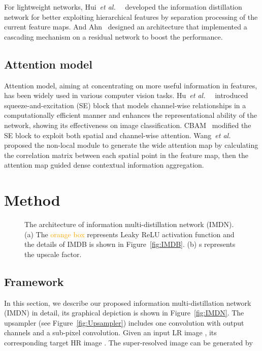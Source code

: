 \documentclass[sigconf]{acmart}
\newcommand{\etal}{\emph{et al.}~}
\begin{document}
For lightweight networks, Hui~\etal~\cite{IDN} developed the information distillation network for better exploiting hierarchical features by separation processing of the current feature maps. And Ahn~\cite{CARN} designed an architecture that implemented a cascading mechanism on a residual network to boost the performance.
\subsection{Attention model}
Attention model, aiming at concentrating on more useful information in features, has been widely used in various computer vision tasks. Hu~\etal~\cite{SENet} introduced squeeze-and-excitation (SE) block that models channel-wise relationships in a computationally efficient manner and enhances the representational ability of the network, showing its effectiveness on image classification. CBAM~\cite{CBAM} modified the SE block to exploit both spatial and channel-wise attention. Wang~\etal~\cite{non-local} proposed the non-local module to generate the wide attention map by calculating the correlation matrix between each spatial point in the feature map, then the attention map guided dense contextual information aggregation.

\section{Method}
\begin{figure*}[htpb]
	\centering
	\hfil
	\vspace{-3mm}
	\caption{The architecture of information multi-distillation network (IMDN). (a) The \textcolor{orange}{orange box} represents Leaky ReLU activation function and the details of IMDB is shown in Figure~\ref{fig:IMDB}. (b) s represents the upscale factor.}
\end{figure*}


\subsection{Framework}
In this section, we describe our proposed information multi-distillation network (IMDN) in detail, its graphical depiction is shown in Figure~\ref{fig:IMDN}. The upsampler (see Figure~\ref{fig:Upsampler}) includes one  convolution with  output channels and a sub-pixel convolution. Given an input LR image , its corresponding target HR image . The super-resolved image  can be generated by
\end{document}
